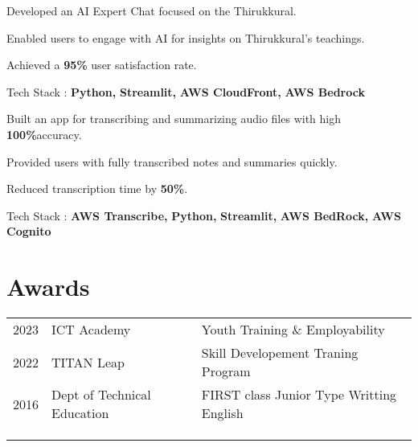 \documentclass[]{deedy-resume-openfont}
\begin{document}
\begin{minipage}[t]{0.66\textwidth}
\begin{tightemize}
\item Developed an AI Expert Chat focused on the Thirukkural. 
\item Enabled users to engage with AI for insights on Thirukkural's teachings.
\item Achieved a \textbf{95\%} user satisfaction rate.
\item Tech Stack : \textbf{Python, } \textbf{Streamlit, } \textbf{AWS CloudFront, } \textbf{AWS Bedrock}
\end{tightemize}
\sectionsep

\begin{tightemize}
\item Built an app for transcribing and summarizing audio files with high \textbf{100\%}accuracy.
\item Provided users with fully transcribed notes and summaries quickly.
\item Reduced transcription time by \textbf{50\%}.
\item Tech Stack :   \textbf{AWS Transcribe, } \textbf{Python, } \textbf{Streamlit, } \textbf{AWS BedRock, }  \textbf{AWS Cognito}
\end{tightemize}
\sectionsep


\section{Awards} 
\begin{tabular}{rll}
2023& ICT Academy& Youth Training \& Employability\\
2022& TITAN Leap& Skill Developement Traning Program\\
2016& Dept of Technical Education& FIRST class Junior Type Writting English\\
& & \\
& & \\
& & \\
\end{tabular}
\sectionsep





\end{minipage} 
\end{document}
